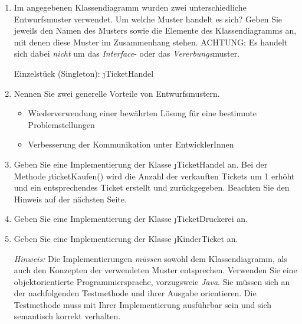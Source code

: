 \documentclass{lehramt-informatik-aufgabe}
\begin{document}
\begin{enumerate}


\item Im angegebenen Klassendiagramm wurden zwei unterschiedliche
Entwurfsmuster verwendet. Um welche Muster handelt es sich? Geben Sie
jeweils den Namen des Musters sowie die Elemente des Klassendiagramms
an, mit denen diese Muster im Zusammenhang stehen. ACHTUNG: Es handelt
sich dabei \emph{nicht} um das \emph{Interface}- oder das
\emph{Vererbungs}muster.

\begin{liAntwort}
Einzelstück (Singleton): \j{TicketHandel}
\end{liAntwort}


\item Nennen Sie zwei generelle Vorteile von Entwurfsmustern.

\begin{liAntwort}
\begin{itemize}
\item Wiederverwendung einer bewährten Lösung für eine bestimmte
Problemstellungen

\item Verbesserung der Kommunikation unter EntwicklerInnen
\end{itemize}
\end{liAntwort}


\item Geben Sie eine Implementierung der Klasse \j{TicketHandel} an. Bei
der Methode \j{ticketKaufen()} wird die Anzahl der verkauften Tickets um
1 erhöht und ein entsprechendes Ticket erstellt und zurückgegeben.
Beachten Sie den Hinweis auf der nächsten Seite.


\item Geben Sie eine Implementierung der Klasse \j{TicketDruckerei} an.


\item Geben Sie eine Implementierung der Klasse \j{KinderTicket} an.

\emph{Hinweis:} Die Implementierungen \emph{müssen} sowohl dem
Klassendiagramm, als auch den Konzepten der verwendeten Muster
entsprechen. Verwenden Sie eine objektorientierte Programmiersprache,
vorzugsweie \emph{Java}. Sie müssen sich an der nachfolgenden
Testmethode und ihrer Ausgabe orientieren. Die Testmethode muss mit
Ihrer Implementierung ausführbar sein und sich semantisch korrekt
verhalten.


\end{enumerate}
\end{document}
